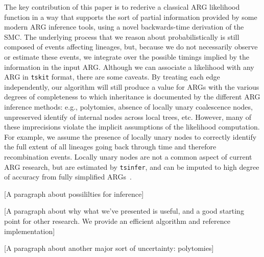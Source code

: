 \documentclass{article}
\newcommand{\comment}[1]{{\it \color{orange} (#1)}}
\begin{document}
The key contribution of this paper is to rederive a classical
ARG likelihood function in a way that supports the sort of partial information
provided by some modern ARG inference tools,
using a novel backwards-time derivation of the SMC.
The underlying process that we reason about probabilistically is still
composed of events affecting lineages, but, because we
do not necessarily observe or estimate these events,
we integrate over the possible timings implied by the information
in the input ARG.
Although we can associate a likelihood with any ARG in \texttt{tskit} format,
there are some caveats. By treating each edge independently,
our algorithm will still produce a value for ARGs with
the various degrees of completeness to which inheritance
is documented by the different ARG inference methods: e.g., polytomies, absence
of locally unary coalescence nodes, unpreserved identify of internal nodes
across local trees, etc.
However, many of these imprecisions violate the implicit
assumptions of the likelihood computation.
For example, we assume the 
presence of locally unary nodes to correctly identify the
full extent of all lineages going back through time and therefore recombination events.
Locally unary nodes are not a common aspect of current ARG research, but 
are estimated by \texttt{tsinfer}, and can be imputed to high
degree of accuracy from fully simplified ARGs~\citep{fritze2024forest}.


[A paragraph about possililties for inference]

[A paragraph about why what we've presented is useful, and a good starting
point for other research. We provide an efficient algorithm and 
reference implementation]

[A paragraph about another major sort of uncertainty: polytomies]

% 
\end{document}
